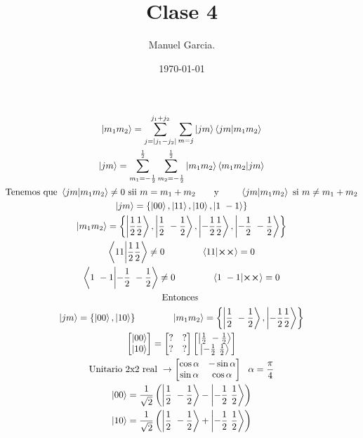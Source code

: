\documentclass{article}
\title{Clase 4}
\author{Manuel Garcia.}
\date{\today}
\begin{document}
\maketitle

\section{}
\begin{gather*}
  \ket{m_1 m_2 } = \displaystyle\sum_{j = \left|j_1-j_2 \right|}^{j_1 +j_2 } \displaystyle\sum_{m = j }^{} \ket{jm } \bra{jm }\ket{m_1m_2 }\\
  \ket{jm } = \displaystyle\sum_{m_1 = -\frac{1}{2}}^{\frac{1}{2}} \displaystyle\sum_{m_2= -\frac{1}{2}}^{\frac{1}{2}} \ket{m_1m_2 } \bra{m_1m_2 }\ket{jm }  \\
  \text{Tenemos que } \bra{jm }\ket{m_1m_2 } \neq 0 \text{ sii }m = m_1+m_2 \qquad \text{y }\qquad \bra{jm }\ket{m_1m_2 } \text{ si }m \neq m_1+m_2  \\
  \ket{jm } = \{\ket{00 }, \ket{11 }, \ket{10 }, \ket{1\ -1 }\}\\
  \ket{m_1m_2 } = \left\{\ket{\frac{1}{2}\frac{1}{2}}, \ket{\frac{1}{2}\ - \frac{1}{2}}, \ket{- \frac{1}{2} \frac{1}{2}}, \ket{- \frac{1}{2}\ - \frac{1}{2}}\right\}\\
  \bra{11 }\ket{\frac{1}{2}\frac{1}{2}} \neq 0 \qquad \qquad \bra{11}\ket{\cross \cross } = 0 \\
  \bra{1\ -1 }\ket{- \frac{1}{2} \ - \frac{1}{2}} \neq 0 \qquad \qquad \bra{1 \ -1 }\ket{\cross \cross } = 0 \\
  \text{Entonces }\\
  \ket{jm } = \{\ket{00 }, \ket{10 }\} \qquad \qquad \ket{m_1m_2 } = \left\{ \ket{\frac{1 }{2} \ - \frac{1}{2}}, \ket{- \frac{1}{2} \frac{1}{2}}   \right\}\\
  \begin{bmatrix}
      \ket{00 } \\
      \ket{10 }  
  \end{bmatrix} = \begin{bmatrix}
      ? & ? \\
      ? & ?
  \end{bmatrix} \begin{bmatrix}
      \ket{\frac{1}{2} \ -\frac{1}{2}} \\
      \ket{- \frac{1}{2}\  \frac{1}{2}}
    \end{bmatrix}  \\
    \text{Unitario 2x2 real }\rightarrow \begin{bmatrix}
        \cos{\alpha} & -\sin{\alpha} \\
        \sin{\alpha} & \cos{\alpha}
    \end{bmatrix}  \ \ \alpha= \frac{\pi}{4 }\\
    \ket{00 } = \frac{1}{\sqrt{2 } } \left(\ket{\frac{1}{2}\ -\frac{1}{2}} - \ket{-\frac{1}{2} \ \frac{1}{2}}\right)\\
    \ket{10 } = \frac{1}{\sqrt{2 } } \left(\ket{\frac{1}{2}\ -\frac{1}{2}} + \ket{-\frac{1}{2} \ \frac{1}{2}}\right)
\end{gather*}
\end{document}
